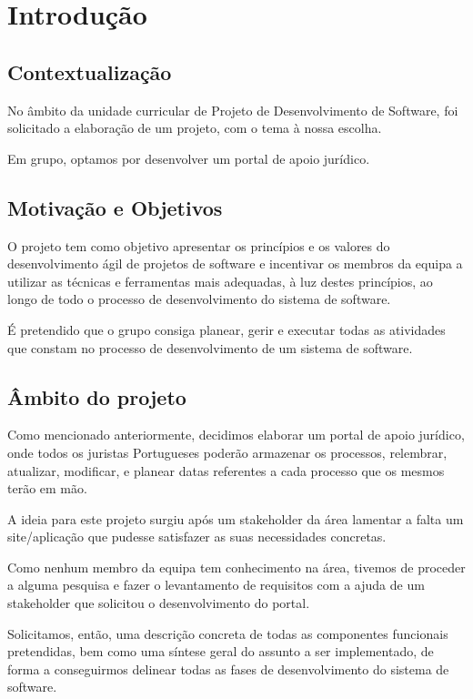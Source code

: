 \vspace{1cm}
\section{Introdução}

\subsection{Contextualização}

\indent \par No âmbito da unidade curricular de Projeto de Desenvolvimento de Software, foi solicitado a elaboração de um projeto, com o tema à nossa escolha.
\indent \par Em grupo, optamos por desenvolver um portal de apoio jurídico.

\subsection{Motivação e Objetivos}

\indent \par O projeto tem como objetivo apresentar os princípios e os valores do desenvolvimento ágil de projetos de software e incentivar os membros da equipa a utilizar as técnicas e ferramentas mais adequadas, à luz destes princípios, ao longo de todo o processo de desenvolvimento do sistema de software.
\indent \par É pretendido que o grupo consiga planear, gerir e executar todas as atividades que constam no processo de desenvolvimento de um sistema de software.

\subsection{Âmbito do projeto}

\indent \par Como mencionado anteriormente, decidimos elaborar um portal de apoio jurídico, onde todos os juristas Portugueses poderão armazenar os processos, relembrar, atualizar, modificar, e planear datas referentes a cada processo que os mesmos terão em mão.
\indent \par A ideia para este projeto surgiu após um stakeholder da área lamentar a falta um site/aplicação que pudesse satisfazer as suas necessidades concretas.
\indent \par Como nenhum membro da equipa tem conhecimento na área, tivemos de proceder a alguma pesquisa e fazer o levantamento de requisitos com a ajuda de um stakeholder que solicitou o desenvolvimento do portal. 
\indent \par Solicitamos, então, uma descrição concreta de todas as componentes funcionais pretendidas, bem como uma síntese geral do assunto a ser implementado, de forma a conseguirmos delinear todas as fases de desenvolvimento do sistema de software.












